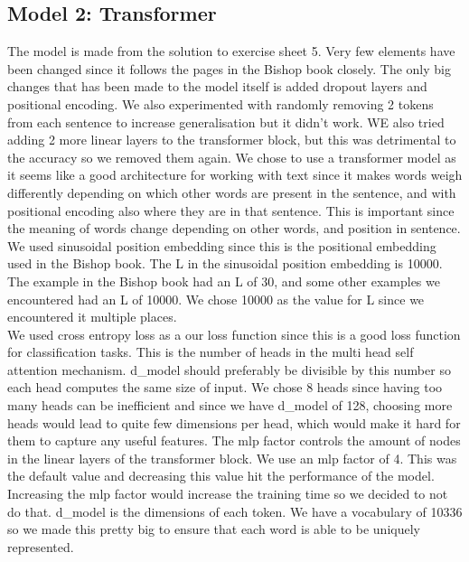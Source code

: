 \subsection{Model 2: Transformer}
The model is made from the solution to exercise sheet 5. Very few elements have been changed since it follows the pages in the Bishop book closely. The only big changes that has been made to the model itself is added dropout layers and positional encoding. We also experimented with randomly removing 2 tokens from each sentence to increase generalisation but it didn't work. WE also tried adding 2 more linear layers to the transformer block, but this was detrimental to the accuracy so we removed them again.
We chose to use a transformer model as it seems like a good architecture for working with text since it makes words weigh differently depending on which other words are present in the sentence, and with positional encoding also where they are in that sentence. This is important since the meaning of words change depending on other words, and position in sentence.
We used sinusoidal position embedding since this is the positional embedding used in the Bishop book.
The L in the sinusoidal position embedding is 10000. The example in the Bishop book had an L of 30, and some other examples we encountered had an L of 10000. We chose 10000 as the value for L since we encountered it multiple places.\\

We used cross entropy loss as a our loss function since this is a good loss function for classification tasks.
This is the number of heads in the multi head self attention mechanism. d\_model should preferably be divisible by this number so each head computes the same size of input. We chose 8 heads since having too many heads can be inefficient and since we have d\_model of 128, choosing more heads would lead to quite few dimensions per head, which would make it hard for them to capture any useful features.
The mlp factor controls the amount of nodes in the linear layers of the transformer block. We use an mlp factor of 4. This was the default value and decreasing this value hit the performance of the model. Increasing the mlp factor would increase the training time so we decided to not do that.
d\_model is the dimensions of each token. We have a vocabulary of 10336 so we made this pretty big to ensure that each word is able to be uniquely represented. \\

